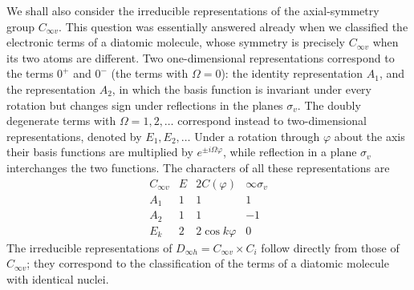 We shall also consider the irreducible representations of the axial-symmetry group $C_{\infty v}$. This question was essentially answered already when we classified the electronic terms of a diatomic molecule, whose symmetry is precisely $C_{\infty v}$ when its two atoms are different. Two one-dimensional representations correspond to the terms $0^+$ and $0^-$ (the terms with $\Omega=0$): the identity representation $A_1$, and the representation $A_2$, in which the basis function is invariant under every rotation but changes sign under reflections in the planes $\sigma_v$. The doubly degenerate terms with $\Omega=1,2,\ldots$ correspond instead to two-dimensional representations, denoted by $E_1,E_2,\ldots$ Under a rotation through $\varphi$ about the axis their basis functions are multiplied by $e^{\pm i\Omega\varphi}$, while reflection in a plane $\sigma_v$ interchanges the two functions. The characters of all these representations are
\begin{equation}
\begin{array}{c|ccc}
 C_{\infty v}&E&2C(\varphi)&\infty\sigma_v\\ \hline
 A_1&1&1&1\\
 A_2&1&1&-1\\
 E_k&2&2\cos k\varphi&0
\end{array}
\tag{98.5}
\end{equation}
The irreducible representations of $D_{\infty h}=C_{\infty v}\times C_i$ follow directly from those of $C_{\infty v}$; they correspond to the classification of the terms of a diatomic molecule with identical nuclei.

